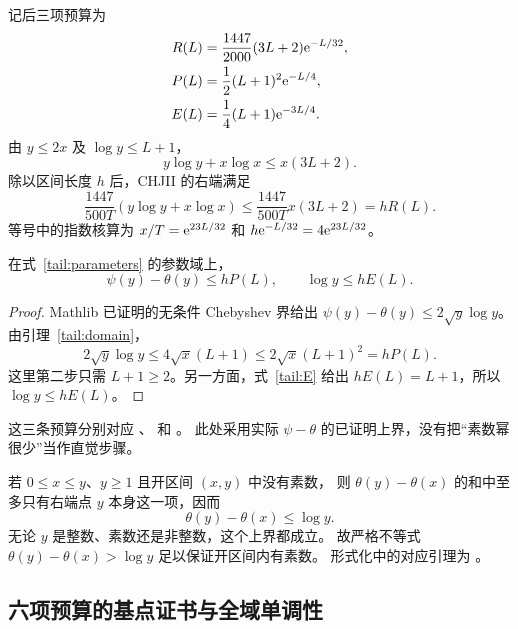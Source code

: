 记后三项预算为
\begin{align}
 R(L)&=\frac{1447}{2000}(3L+2)\mathrm e^{-L/32},\label{tail:R}\\
 P(L)&=\frac12(L+1)^2\mathrm e^{-L/4},\label{tail:P}\\
 E(L)&=\frac14(L+1)\mathrm e^{-3L/4}.\label{tail:E}
\end{align}
由 $y\leq2x$ 及 $\log y\leq L+1$，
\[
 y\log y+x\log x\leq x(3L+2).
\]
除以区间长度 $h$ 后，CHJII 的右端满足
\begin{equation}\label{tail:R-proof}
 \frac{1447}{500T}(y\log y+x\log x)
 \leq\frac{1447}{500T}x(3L+2)=hR(L).
\end{equation}
等号中的指数核算为 $x/T=\mathrm e^{23L/32}$ 和
$h\mathrm e^{-L/32}=4\mathrm e^{23L/32}$。

\begin{lemma}[素数幂与右端点的预算]\label{tail:arithmetic-errors}
在式~\eqref{tail:parameters} 的参数域上，
\begin{equation}\label{tail:arithmetic-estimates}
 \psi(y)-\theta(y)\leq hP(L),\qquad \log y\leq hE(L).
\end{equation}
\end{lemma}

\begin{proof}
Mathlib 已证明的无条件 Chebyshev 界给出
$\psi(y)-\theta(y)\leq2\sqrt y\log y$。
由引理~\ref{tail:domain}，
\[
 2\sqrt y\log y\leq4\sqrt x(L+1)
 \leq2\sqrt x(L+1)^2=hP(L).
\]
这里第二步只需 $L+1\geq2$。另一方面，式~\eqref{tail:E} 给出
$hE(L)=L+1$，所以 $\log y\leq hE(L)$。
\end{proof}

这三条预算分别对应
、
 和
。
此处采用实际 $\psi-\theta$ 的已证明上界，没有把“素数幂很少”当作直觉步骤。

若 $0\leq x\leq y$、$y\geq1$ 且开区间 $(x,y)$ 中没有素数，
则 $\theta(y)-\theta(x)$ 的和中至多只有右端点 $y$ 本身这一项，因而
\begin{equation}\label{tail:open-extraction}
 \theta(y)-\theta(x)\leq\log y.
\end{equation}
无论 $y$ 是整数、素数还是非整数，这个上界都成立。
故严格不等式 $\theta(y)-\theta(x)>\log y$ 足以保证开区间内有素数。
形式化中的对应引理为
。

\subsection{六项预算的基点证书与全域单调性}

